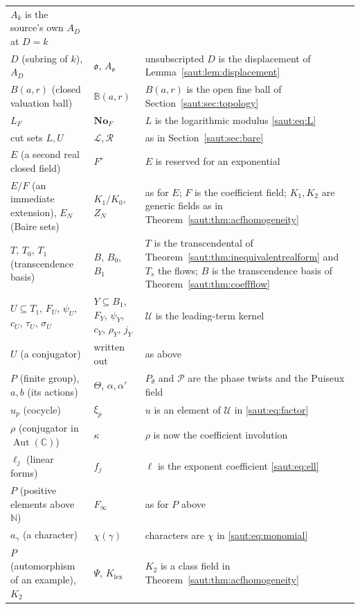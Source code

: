 \documentclass[11pt]{article}
\theoremstyle{definition}
\theoremstyle{remark}
\newcommand{\No}{\mathbf{No}}
\newcommand{\C}{\mathbb C}
\newcommand{\N}{\mathbb N}
\newcommand{\U}{\mathcal U}
\newcommand{\Aut}{\operatorname{Aut}}
\numberwithin{equation}{section}
\begin{document}
\begin{center}
\begin{longtable}{@{}>{\RaggedRight\arraybackslash}p{}>{\RaggedRight\arraybackslash}p{}>{\RaggedRight\arraybackslash}p{}@{}}
$A_k$ is the source's own $A_D$ at $D=k$\\
$D$ (subring of $k$), $A_D$ & $\mathfrak o$, $A_{\mathfrak o}$ & unsubscripted $D$
is the displacement of Lemma~\ref{saut:lem:displacement}\\
$B(a,r)$ (closed valuation ball) & $\mathbb B(a,r)$ & $B(a,r)$ is the open fine
ball of Section~\ref{saut:sec:topology}\\
$L_F$ & $\No_F$ & $L$ is the logarithmic modulus \eqref{saut:eq:L}\\
cut sets $L,U$ & $\mathcal L,\mathcal R$ & as in Section~\ref{saut:sec:bare}\\
$E$ (a second real closed field) & $F'$ & $E$ is reserved for an exponential\\
$E/F$ (an immediate extension), $E_N$ (Baire sets) & $K_1/K_0$, $Z_N$ & as for $E$;
$F$ is the coefficient field; $K_1,K_2$ are generic fields as in
Theorem~\ref{saut:thm:acfhomogeneity}\\
$T$, $T_0$, $T_1$ (transcendence basis) & $B$, $B_0$, $B_1$ & $T$ is the
transcendental of Theorem~\ref{saut:thm:inequivalentrealform} and $T_s$ the flows;
$B$ is the transcendence basis of Theorem~\ref{saut:thm:coeffflow}\\
$U\subseteq T_1$, $F_U$, $\psi_U$, $c_U$, $\tau_U$, $\sigma_U$ & $Y\subseteq B_1$,
$F_Y$, $\psi_Y$, $c_Y$, $\rho_Y$, $j_Y$ & $\U$ is the leading-term kernel\\
$U$ (a conjugator) & written out & as above\\
$P$ (finite group), $a,b$ (its actions) & $\Theta$, $\alpha,\alpha'$ & $P_\theta$ and
$\mathcal P$ are the phase twists and the Puiseux field\\
$u_p$ (cocycle) & $\xi_p$ & $u$ is an element of $\U$ in \eqref{saut:eq:factor}\\
$\rho$ (conjugator in $\Aut(\C)$) & $\kappa$ & $\rho$ is now the coefficient involution\\
$\ell_j$ (linear forms) & $f_j$ & $\ell$ is the exponent coefficient \eqref{saut:eq:ell}\\
$P$ (positive elements above $\N$) & $F_\infty$ & as for $P$ above\\
$a_\gamma$ (a character) & $\chi(\gamma)$ & characters are $\chi$ in
\eqref{saut:eq:monomial}\\
$P$ (automorphism of an example), $K_2$ & $\Psi$, $K_{\mathrm{lex}}$ & $K_2$ is a
class field in Theorem~\ref{saut:thm:acfhomogeneity}\\
\bottomrule
\end{longtable}
\end{center}
\end{document}
